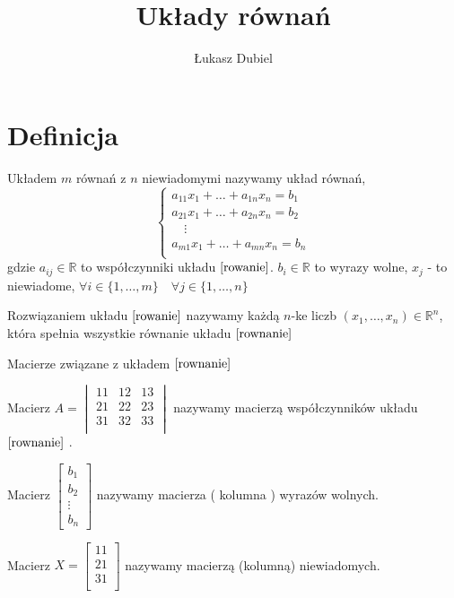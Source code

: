 \documentclass[11pt]{article}
\author{Łukasz Dubiel}
\title{Układy równań}
\begin{document}
\maketitle

\section{Definicja} Układem $m$ równań z $n$ niewiadomymi nazywamy układ równań,
\begin{equation}
\label{rowanie}
\begin{cases}
a_{11} x_1 + \ldots + a_{1n} x_n = b_1 \\
a_{21} x_1 + \ldots + a_{2n} x_n = b_2 \\
\quad \vdots \\
a_{m1} x_1 + \ldots + a_{mn} x_n = b_n \\
\end{cases}
\end{equation}
gdzie $a_{ij} \in \mathbb{R}$ to współczynniki układu $\eqref{rowanie}$. $b_i \in \mathbb{R}$ to wyrazy wolne, $x_j$ - to niewiadome, $\forall i \in \{1, \ldots , m\} \quad \forall j \in \{1,\ldots, n\}$

Rozwiązaniem układu $\eqref{rowanie}$ nazywamy każdą $n$-ke liczb $(x_1,\ldots,x_n) \in \mathbb{R}^n$, która spełnia wszystkie równanie układu $\eqref{rownanie}$

Macierze związane z układem $\eqref{rownanie}$

Macierz $ A = \begin{vmatrix}
	11 & 12 & 13\\
	21 & 22 & 23\\
	31 & 32 & 33\\
\end{vmatrix}$ nazywamy macierzą współczynników układu $\eqref{rownanie}$ .

Macierz $\begin{bmatrix}
	b_1 \\
	b_2 \\
	\vdots \\
	b_n
\end{bmatrix}$ nazywamy macierza ( kolumna ) wyrazów wolnych.

Macierz $ X = \begin{bmatrix}
	11\\
	21\\
	31\\
\end{bmatrix}$ nazywamy macierzą (kolumną) niewiadomych.
\end{document}
